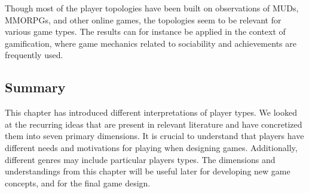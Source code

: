 \documentclass[../Main.tex]{subfiles}
\begin{document}
Though most of the player topologies have been built on observations of MUDs, MMORPGs, and other online games, the topologies seem to be relevant for various game types. The results can for instance be applied in the context of gamification, where game mechanics related to sociability and achievements are frequently used.


\subsection{Summary}
This chapter has introduced different interpretations of player types. We looked at the recurring ideas that are present in relevant literature and have concretized them into seven primary dimensions. It is crucial to understand that players have different needs and motivations for playing when designing games. Additionally, different genres may include particular players types. The dimensions and understandings from this chapter will be useful later for developing new game concepts, and for the final game design.

\biblio %
\end{document}
